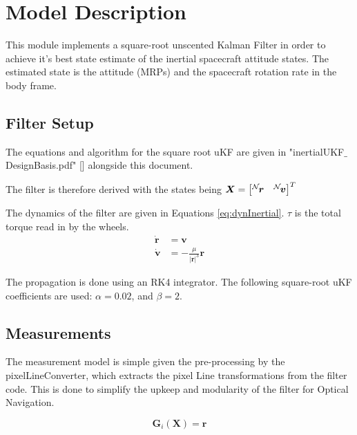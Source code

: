 
\section{Model Description}

This module implements a square-root unscented Kalman Filter in order to achieve it's best state estimate of the inertial spacecraft attitude states. The estimated state is the attitude (MRPs) and the spacecraft rotation rate in the body frame. 

\subsection{Filter Setup} %

The equations and algorithm for the square root uKF are given in "inertialUKF$\_$DesignBasis.pdf" [] alongside this document.

The filter is therefore derived with the states being $\bm X =\begin{bmatrix} \leftexp{N}{\bm r}&  \leftexp{N}{\bm v} \end{bmatrix}^{T}$

The dynamics of the filter are given in Equations \eqref{eq:dynInertial}. $\tau$ is the total torque read in by the wheels. 
\begin{align}
\label{eq:dynInertial}
\dot{\bm r} &=\bm v \\
\dot{\bm v} & = - \frac{\mu}{|\bm r|^3} \bm r
\end{align}

The propagation is done using an RK4 integrator. 
The following square-root uKF coefficients are used: $\alpha = 0.02$, and $\beta = 2$. 


\subsection{Measurements}

The measurement model is simple given the pre-processing by the pixelLineConverter, which extracts the pixel Line transformations from the filter code. This is done to simplify the upkeep and modularity of the filter for Optical Navigation. 

\begin{equation}\label{eq:meas}
\bm G_i(\bm X) = \bm r
\end{equation}
